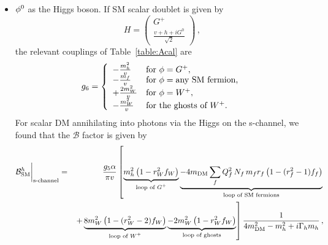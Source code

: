 \begin{itemize}
\item ${\phi^0}$ as the Higgs boson. If SM scalar doublet is given by
\begin{equation}
H = \begin{pmatrix} G^+ \\ \frac{v+h +i G^0}{\sqrt{2}}\end{pmatrix}\,,
\end{equation}
the relevant couplings of Table~\ref{table:Acal} are  
\begin{equation}
g_6=
\left\{
\begin{array}{ll}
-\frac{m_h^2}{v}   &\text{for }{\phi}=G^+,\\
-\frac{m_f}{v}  &\text{for }{\phi}=\text{any SM fermion,}\\
+\frac{2 m_W^2}{v} &\text{for }{\phi} = W^+,\\
-\frac{m_W^2}{v} &\text{for the ghosts of }W^+.\\
\end{array}
\right.
\end{equation}
%
For scalar DM annihilating into photons via the Higgs on the s-channel, we found that the $\mathcal{B}$ factor is given by
%
\begin{eqnarray}
{\cal B}^h_\text{SM}\bigg|_\text{s-channel} &=&\frac{g_5 \alpha}{\pi v}  \left[\underbrace{ m_h^2 \left( 1-r_W^2 f_W\right)}_{\text{loop of $G^+$} } \underbrace{-4 m_{\text{DM}}  \sum_f  Q_f^2\, N_f\, m_f r_f \left( 1- (r_f^2-1)f_f\right)}_{\text{loop of SM fermions} } \right.\\
&&\left.
+ \underbrace{8 m_W^2\left(1-(r_W^2-2)f_W \right)}_{\text{loop of $W^+$} } \underbrace{-2  m_W^2\left(1-r_W^2f_W \right)}_{\text{loop of ghosts} }\right]\frac{1}{4m_{\text{DM}}^2-m_h^2+i\Gamma_h m_h}\nonumber\,,
\label{eq:schHiggslike0}
\end{eqnarray}


\end{itemize}
